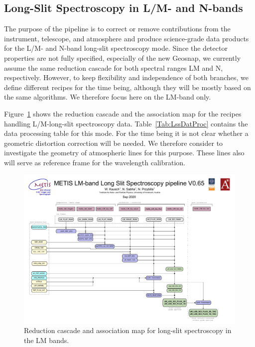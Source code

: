 \subsection{Long-Slit Spectroscopy in L/M- and N-bands}

The purpose of the pipeline is to correct or remove contributions from
the instrument, telescope, and atmosphere and produce science-grade
data products for the L/M- and N-band long-slit spectroscopy
mode. Since the detector properties are not fully specified, especially of the new Geosnap, we currently assume
the same reduction cascade for both spectral ranges LM and
N, respectively. However, to keep flexibility and independence of both branches, we
define different recipes for the time being, although they will be
mostly based on the same algorithms. We therefore focus here on the LM-band only.

Figure~\ref{Fig:LMLssAssomap} shows the reduction cascade and the association map for the recipes handling L/M-long-slit
spectroscopy data.  Table~\ref{Tab:LssDatProc} contains the data processing table for this mode. For the time being it is not clear whether a geometric
distortion correction will be needed. We therefore consider to investigate
the geometry of atmospheric lines for this purpose. These lines also will
serve as reference frame for the wavelength calibration.

\begin{figure}
  \centering
  \includegraphics[width=0.9\textheight]{figures/LM_LSS_pipeline_wf_draft_latest_v0.65.pdf}
  \caption[Reduction cascade and association map for LM long-slit
  spectroscopy]{Reduction cascade and association map for long-slit
    spectroscopy in the LM bands.  }
  \label{Fig:LMLssAssomap}
\end{figure}

